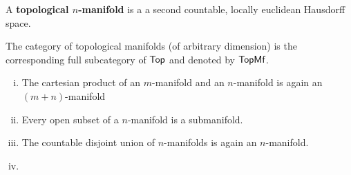 	\begin{definition}
		A \textbf{topological $n$-manifold} is a a second countable, locally euclidean Hausdorff space.

		The category of topological manifolds (of arbitrary dimension) is the corresponding full subcategory of $\textsf{Top}$ and denoted by $\textsf{TopMf}$.
	\end{definition}

	\begin{lemma}
		\vspace{-1.5em}
		\begin{enumerate}[(i)]
			\item{
				The cartesian product of an $m$-manifold and an $n$-manifold is again an $(m+n)$-manifold
			}
			\item{
				Every open subset of a $n$-manifold is a submanifold.
			}
			\item{
				The countable disjoint union of $n$-manifolds is again an $n$-manifold. 
			}
			\item{
			}
		\end{enumerate}
	\end{lemma}

	\begin{remark}




	\end{remark}

	\begin{proposition}

	\end{proposition}

